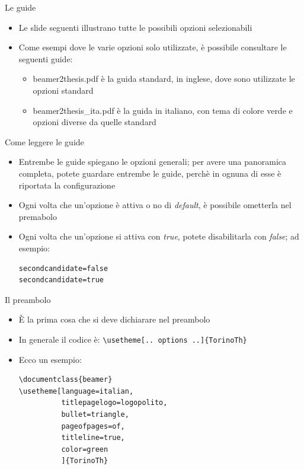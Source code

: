 \begin{tframe}{Le guide}
\begin{itemize}
\item Le slide seguenti illustrano tutte le possibili opzioni selezionabili
\item Come esempi dove le varie opzioni solo utilizzate, è possibile consultare le seguenti guide:
\begin{itemize}
\item beamer2thesis.pdf è la guida standard, in inglese, dove sono utilizzate le opzioni standard
\item beamer2thesis\_ita.pdf è la guida in italiano, con tema di colore verde e opzioni diverse da quelle standard
\end{itemize}
\end{itemize}
\end{tframe}
\begin{frame}[t,fragile]{Come leggere le guide}
\begin{itemize}
\item Entrembe le guide spiegano le opzioni generali; per avere una panoramica completa, potete guardare entrembe le guide, perchè in ognuna di esse è riportata la configurazione
\item Ogni volta che un'opzione è attiva o no di \emph{default}, è possibile ometterla nel premabolo
\item Ogni volta che un'opzione si attiva con \emph{true}, potete disabilitarla con \emph{false}; ad esempio:
\begin{verbatim}
secondcandidate=false 
secondcandidate=true 
\end{verbatim}
\end{itemize}
\end{frame}
\begin{frame}[t,fragile]{Il preambolo}
\begin{itemize}
\item \`E la prima cosa che si deve dichiarare nel preambolo
\item In generale il codice è: \verb!\usetheme[.. options ..]{TorinoTh}!
\item Ecco un esempio:
\begin{verbatim}
\documentclass{beamer}
\usetheme[language=italian,
          titlepagelogo=logopolito,
          bullet=triangle,
          pageofpages=of,
          titleline=true,
          color=green
          ]{TorinoTh}
\end{verbatim}
\end{itemize}
\end{frame}
